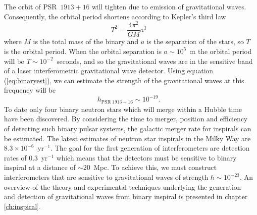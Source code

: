 The orbit of PSR~$1913+16$ will tighten due to emission of gravitational waves.
Consequently, the orbital period shortens according to Kepler's third law
\begin{equation}
T^2 = \frac{4\pi^2}{GM}a^3
\end{equation}
where $M$ is the total mass of the binary and $a$ is the separation of the
stars, so $T$ is the orbital period. When the orbital separation is $a \sim
10^5$~m the orbital period will be $T\sim10^{-2}$~seconds, and so the
gravitational waves are in the sensitive band of a laser interferometric
gravitational wave detector. Using equation (\ref{eq:binaryest}), we
can estimate the strength of the gravitational waves at this frequency
will be
\begin{equation}
h_{\mathrm{PSR}\;1913+16} \sim 10^{-19}.
\label{eq:hbns}
\end{equation}
To date only four binary neutron stars which will merge within a Hubble time
have been discovered.  By considering the time to merger, position and
efficiency of detecting such binary pulsar systems, the galactic merger rate
for inspirals can be estimated\cite{Phinney:1991ei}.  The latest estimates of
neutron star inspirals in the Milky Way are $8.3 \times 10^{-6}$~yr$^{-1}$. The
goal for the first generation of interferometers are detection rates of
$0.3$~yr$^{-1}$ which means that the detectors must be sensitive to binary
inspiral at a distance of $\sim 20$~Mpc. To achieve this, we must construct
interferometers that are sensitive to gravitational waves of strength $h \sim
10^{-23}$. An overview of the theory and experimental techniques underlying
the generation and detection of gravitational waves from binary inspiral is
presented in chapter \ref{ch:inspiral}.

